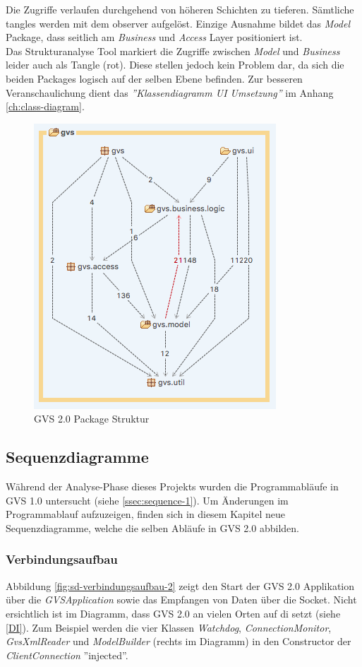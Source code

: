 \documentclass[11pt,a4paper,english,oneside]{book}
\numberwithin{equation}{chapter}
\begin{document}
	\noindent
	Die Zugriffe verlaufen durchgehend von höheren Schichten zu tieferen. Sämtliche \glspl{tangle} werden mit dem \gls{observer} aufgelöst. Einzige Ausnahme bildet das \textit{Model} Package, dass seitlich am \textit{Business} und \textit{Access} Layer positioniert ist. \\
	\noindent
	Das Strukturanalyse Tool markiert die Zugriffe zwischen \textit{Model} und \textit{Business} leider auch als Tangle (rot). Diese stellen jedoch kein Problem dar, da sich die beiden Packages logisch auf der selben Ebene befinden. Zur besseren Veranschaulichung dient das \textit{''Klassendiagramm UI Umsetzung''} im Anhang \ref{ch:class-diagram}.
	
	\begin{figure}[h!]
		\centering
		\includegraphics[width=0.4\linewidth]{assets/images/structure-gvs2}
		\caption{GVS 2.0 Package Struktur}
		\label{fig:structure-gvs2}
	\end{figure}
	
	
	\subsection{Sequenzdiagramme}
	Während der Analyse-Phase dieses Projekts wurden die Programmabläufe in GVS 1.0 untersucht (siehe \ref{ssec:sequence-1}). Um Änderungen im Programmablauf aufzuzeigen, finden sich in diesem Kapitel neue Sequenzdiagramme, welche die selben Abläufe in GVS 2.0 abbilden. 
	
	\subsubsection{Verbindungsaufbau}
	Abbildung \ref{fig:sd-verbindungsaufbau-2} zeigt den Start der GVS 2.0 Applikation über die \textit{GVSApplication} sowie das Empfangen von Daten über die Socket. Nicht ersichtlich ist im Diagramm, dass GVS 2.0 an vielen Orten auf \gls{di} setzt (siehe \ref{DI}). Zum Beispiel werden die vier Klassen \textit{Watchdog},  \textit{ConnectionMonitor},  \textit{GvsXmlReader} und  \textit{ModelBuilder} (rechts im Diagramm) in den Constructor der  \textit{ClientConnection} ''injected''.\\
	
\end{document}
